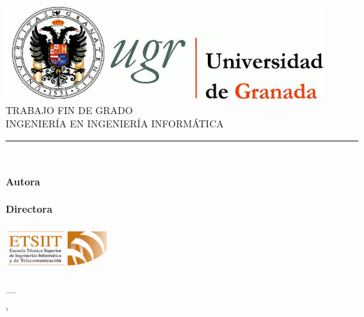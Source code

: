 \begin{titlepage}
 
 
\newlength{\centeroffset}
\setlength{\centeroffset}{-0.5\oddsidemargin}
\addtolength{\centeroffset}{0.5\evensidemargin}
\thispagestyle{empty}

\noindent\hspace*{\centeroffset}\begin{minipage}{\textwidth}

\centering
\includegraphics[width=0.9\textwidth]{imagenes/logo_ugr.jpg}\\[1.4cm]

\textsc{ \Large TRABAJO FIN DE GRADO\\[0.2cm]}
\textsc{ INGENIERÍA EN INGENIERÍA INFORMÁTICA}\\[1cm]
% 
{\Huge\bfseries \myTitle}
\noindent\rule[-1ex]{\textwidth}{3pt}\\[3.5ex]
\end{minipage}

\vspace{2.5cm}
\noindent\hspace*{\centeroffset}\begin{minipage}{\textwidth}
\centering

\textbf{Autora}\\ {\myName}\\[2.5ex]
\textbf{Directora}\\
{\myProf}\\[2cm]
\includegraphics[width=0.3\textwidth]{imagenes/etsiit_logo.png}\\[0.1cm]
\textsc{\myFaculty}\\
\textsc{---}\\
\textsc{\myLocation, \myTime}
\end{minipage}
\end{titlepage}


